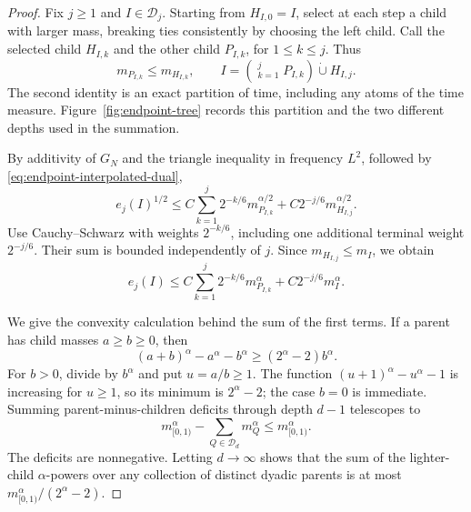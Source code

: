 \begin{proof}
Fix $j\ge1$ and $I\in\mathcal D_j$.  Starting from $H_{I,0}=I$, select
at each step a child with larger mass, breaking ties consistently by
choosing the left child.  Call the selected child $H_{I,k}$ and the other
child $P_{I,k}$, for $1\le k\le j$.  Thus
\[
 m_{P_{I,k}}\le m_{H_{I,k}},\qquad
 I=\left(\mathop{\dot\bigcup}_{k=1}^jP_{I,k}\right)
                    \mathbin{\dot\cup}H_{I,j}.
\]
The second identity is an exact partition of time, including any atoms
of the time measure.  Figure~\ref{fig:endpoint-tree} records this partition
and the two different depths used in the summation.



By additivity of $G_N$ and the triangle inequality in frequency $L^2$,
followed by \eqref{eq:endpoint-interpolated-dual},
\[
 e_j(I)^{1/2}
 \le C\sum_{k=1}^j2^{-k/6}m_{P_{I,k}}^{\alpha/2}
          +C2^{-j/6}m_{H_{I,j}}^{\alpha/2}.
\]
Use Cauchy--Schwarz with weights $2^{-k/6}$, including one additional
terminal weight $2^{-j/6}$.  Their sum is bounded independently of $j$.
Since $m_{H_{I,j}}\le m_I$, we obtain
\begin{equation}
 e_j(I)\le C\sum_{k=1}^j2^{-k/6}m_{P_{I,k}}^\alpha
                    +C2^{-j/6}m_I^\alpha.
 \label{eq:endpoint-heavy-path}
\end{equation}

We give the convexity calculation behind the sum of the first terms.
If a parent has child masses $a\ge b\ge0$, then
\begin{equation}
 (a+b)^\alpha-a^\alpha-b^\alpha
       \ge(2^\alpha-2)b^\alpha.
 \label{eq:endpoint-convexity-deficit}
\end{equation}
For $b>0$, divide by $b^\alpha$ and put $u=a/b\ge1$.
The function $(u+1)^\alpha-u^\alpha-1$ is increasing for $u\ge1$,
so its minimum is $2^\alpha-2$; the case $b=0$ is immediate.
Summing parent-minus-children deficits through depth $d-1$ telescopes to
\[
 m_{[0,1)}^\alpha-\sum_{Q\in\mathcal D_d}m_Q^\alpha
       \le m_{[0,1)}^\alpha.
\]
The deficits are nonnegative.  Letting $d\to\infty$ shows that the sum of
the lighter-child $\alpha$-powers over any collection of distinct dyadic
parents is at most
$m_{[0,1)}^\alpha/(2^\alpha-2)$.


\end{proof}
